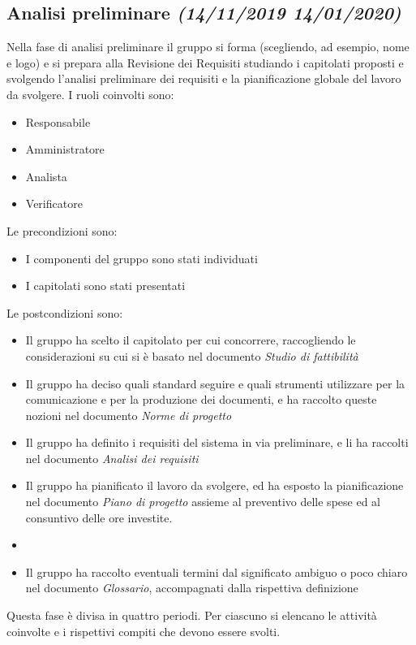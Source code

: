 \documentclass[../piano-di-progetto.tex]{subfiles}
\begin{document}
\subsection[Analisi preliminare]{Analisi preliminare {\normalsize\normalfont\itshape(14/11/2019  14/01/2020)}}%
\label{sub:analisi_preliminare}
Nella fase di analisi preliminare il gruppo si forma (scegliendo, ad esempio, nome e logo) e si prepara alla Revisione dei Requisiti studiando i capitolati proposti e svolgendo l'analisi preliminare dei requisiti e la pianificazione globale del lavoro da svolgere.
I ruoli coinvolti sono:
\begin{itemize}
  \item Responsabile
  \item Amministratore
  \item Analista
  \item Verificatore
\end{itemize}
Le precondizioni sono:
\begin{itemize}
  \item I componenti del gruppo sono stati individuati
  \item I capitolati sono stati presentati
\end{itemize}
Le postcondizioni sono:
\begin{itemize}
  \item Il gruppo ha scelto il capitolato per cui concorrere, raccogliendo le considerazioni su cui si è basato nel documento \textit{Studio di fattibilità}
  \item Il gruppo ha deciso quali standard seguire e quali strumenti utilizzare per la comunicazione e per la produzione dei documenti, e ha raccolto queste nozioni nel documento \textit{Norme di progetto}
  \item Il gruppo ha definito i requisiti del sistema in via preliminare, e li ha raccolti nel documento \textit{Analisi dei requisiti}
  \item Il gruppo ha pianificato il lavoro da svolgere, ed ha esposto la pianificazione nel documento \textit{Piano di progetto} assieme al preventivo delle spese ed al consuntivo delle ore investite.
  \item {}
  \item Il gruppo ha raccolto eventuali termini dal significato ambiguo o poco chiaro nel documento \textit{Glossario}, accompagnati dalla rispettiva definizione
\end{itemize}
Questa fase è divisa in quattro periodi.
Per ciascuno si elencano le attività coinvolte e i rispettivi compiti che devono essere svolti.
\end{document}
